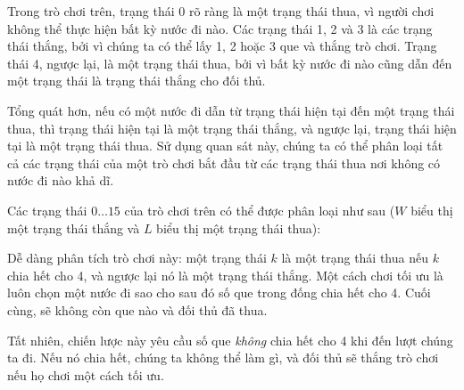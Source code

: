Trong trò chơi trên, trạng thái 0 rõ ràng là một
trạng thái thua, vì người chơi không thể thực hiện
bất kỳ nước đi nào.
Các trạng thái 1, 2 và 3 là các trạng thái thắng,
bởi vì chúng ta có thể lấy 1, 2 hoặc 3 que
và thắng trò chơi.
Trạng thái 4, ngược lại, là một trạng thái thua,
bởi vì bất kỳ nước đi nào cũng dẫn đến một trạng thái
là trạng thái thắng cho đối thủ.

Tổng quát hơn, nếu có một nước đi dẫn
từ trạng thái hiện tại đến một trạng thái thua,
thì trạng thái hiện tại là một trạng thái thắng,
và ngược lại, trạng thái hiện tại là một trạng thái thua.
Sử dụng quan sát này, chúng ta có thể phân loại tất cả các trạng thái
của một trò chơi bắt đầu từ các trạng thái thua nơi
không có nước đi nào khả dĩ.

Các trạng thái $0 \ldots 15$ của trò chơi trên
có thể được phân loại như sau
($W$ biểu thị một trạng thái thắng và $L$ biểu thị một trạng thái thua):
\begin{center}
\end{center}

Dễ dàng phân tích trò chơi này:
một trạng thái $k$ là một trạng thái thua nếu $k$
chia hết cho 4, và ngược lại nó
là một trạng thái thắng.
Một cách chơi tối ưu là
luôn chọn một nước đi sao cho sau đó
số que trong đống
chia hết cho 4.
Cuối cùng, sẽ không còn que nào và
đối thủ đã thua.

Tất nhiên, chiến lược này yêu cầu
số que \emph{không} chia hết cho 4
khi đến lượt chúng ta đi.
Nếu nó chia hết, chúng ta không thể làm gì,
và đối thủ sẽ thắng trò chơi nếu
họ chơi một cách tối ưu.

